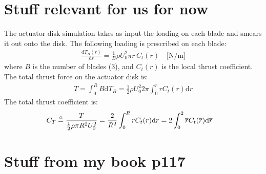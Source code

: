 \documentclass[11pt]{article}
\renewcommand{\d}{\mathrm{d}}
\newcommand{\dr}{{\d}r}
\newcommand{\dT}{{\d}T}
\newcommand{\eqdef}{\stackrel{\mathsmaller{\mathsmaller{\mathsmaller{\triangle}}}}{=}}
\begin{document}
\section{Stuff relevant for us for now}
The actuator disk simulation takes as input the loading on each blade and smears it out onto the disk. The following loading is prescribed on each blade:
\begin{align}
\frac{\dT_B(r)}{\dr} = \frac{1}{B}\rho U_0^2 \pi r \,C_t(r) \quad \text{[N/m]}
\end{align}
where $B$ is the number of blades (3), and $C_t(r)$ is the local thrust coefficient.
% 
The total thrust force on the actuator disk is:
\begin{align}
    T = \int_0^R B\dT_B = \frac{1}{2} \rho U_0^2 2\pi \int_0^r r C_t(r) \dr
\end{align}
The total thrust coefficient is:
\begin{align}
C_{T}&\eqdef \frac{T}{\frac{1}{2} \rho \pi R^2 U_0^2}
= \frac{2}{R^2} \int_0^R  r C_t(r) \dr = 2 \int_0^2 \overline{r} C_t(\overline{r}) {\d}\overline{r}
% 
\end{align}


\section{Stuff from my book p117}
\end{document}
